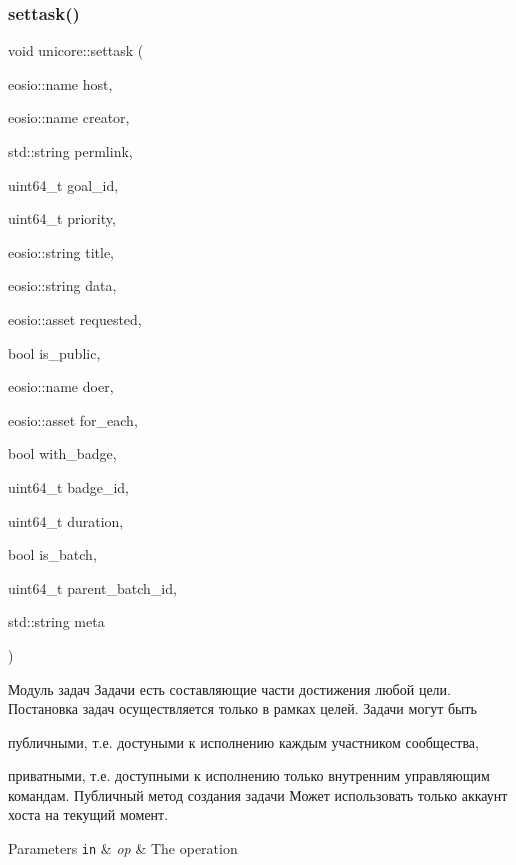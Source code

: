 \subsubsection{\texorpdfstring{settask()}{settask()}}
{\footnotesize\ttfamily void unicore\+::settask (\begin{DoxyParamCaption}\item[{eosio\+::name}]{host,  }\item[{eosio\+::name}]{creator,  }\item[{std\+::string}]{permlink,  }\item[{uint64\+\_\+t}]{goal\+\_\+id,  }\item[{uint64\+\_\+t}]{priority,  }\item[{eosio\+::string}]{title,  }\item[{eosio\+::string}]{data,  }\item[{eosio\+::asset}]{requested,  }\item[{bool}]{is\+\_\+public,  }\item[{eosio\+::name}]{doer,  }\item[{eosio\+::asset}]{for\+\_\+each,  }\item[{bool}]{with\+\_\+badge,  }\item[{uint64\+\_\+t}]{badge\+\_\+id,  }\item[{uint64\+\_\+t}]{duration,  }\item[{bool}]{is\+\_\+batch,  }\item[{uint64\+\_\+t}]{parent\+\_\+batch\+\_\+id,  }\item[{std\+::string}]{meta }\end{DoxyParamCaption})}



Модуль задач Задачи есть составляющие части достижения любой цели. Постановка задач осуществляется только в рамках целей. Задачи могут быть 


\begin{DoxyItemize}
\item публичными, т.\+е. достуными к исполнению каждым участником сообщества,
\item приватными, т.\+е. доступными к исполнению только внутренним управляющим командам. Публичный метод создания задачи Может использовать только аккаунт хоста на текущий момент.
\end{DoxyItemize}


\begin{DoxyParams}[1]{Parameters}
\mbox{\tt in}  & {\em op} & The operation \\
\hline
\end{DoxyParams}
\mbox{\label{classeosio_1_1unicore_a1883144d494a858ab38e04b9a334d07e}} 
